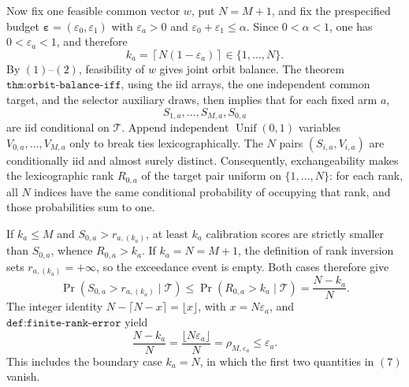 Now fix one feasible common vector \(w\), put \(N=M+1\), and fix the prespecified budget \(\boldsymbol\varepsilon=(\varepsilon_0,\varepsilon_1)\) with \(\varepsilon_a>0\) and \(\varepsilon_0+\varepsilon_1\le\alpha\). Since \(0<\alpha<1\), one has \(0<\varepsilon_a<1\), and therefore
\[
k_a=\left\lceil N(1-\varepsilon_a)\right\rceil\in\{1,\ldots,N\}.
\tag{5}
\]
By \((1)\)--\((2)\), feasibility of \(w\) gives joint orbit balance. The theorem \(\texttt{thm:orbit-balance-iff}\), using the iid arrays, the one independent common target, and the selector auxiliary draws, then implies that for each fixed arm \(a\),
\[
S_{1,a},\ldots,S_{M,a},S_{0,a}
\]
are iid conditional on \(\mathcal T\). Append independent \(\operatorname{Unif}(0,1)\) variables \(V_{0,a},\ldots,V_{M,a}\) only to break ties lexicographically. The \(N\) pairs \((S_{i,a},V_{i,a})\) are conditionally iid and almost surely distinct. Consequently, exchangeability makes the lexicographic rank \(R_{0,a}\) of the target pair uniform on \(\{1,\ldots,N\}\): for each rank, all \(N\) indices have the same conditional probability of occupying that rank, and those probabilities sum to one.

If \(k_a\le M\) and \(S_{0,a}>r_{a,(k_a)}\), at least \(k_a\) calibration scores are strictly smaller than \(S_{0,a}\), whence \(R_{0,a}>k_a\). If \(k_a=N=M+1\), the definition of rank inversion sets \(r_{a,(k_a)}=+\infty\), so the exceedance event is empty. Both cases therefore give
\[
\Pr\!\left(S_{0,a}>r_{a,(k_a)}\mid\mathcal T\right)\le\Pr(R_{0,a}>k_a\mid\mathcal T)=\frac{N-k_a}{N}.
\tag{6}
\]
The integer identity \(N-\lceil N-x\rceil=\lfloor x\rfloor\), with \(x=N\varepsilon_a\), and \(\texttt{def:finite-rank-error}\) yield
\[
\frac{N-k_a}{N}=\frac{\lfloor N\varepsilon_a\rfloor}{N}=\rho_{M,\varepsilon_a}\le\varepsilon_a.
\tag{7}
\]
This includes the boundary case \(k_a=N\), in which the first two quantities in \((7)\) vanish.

